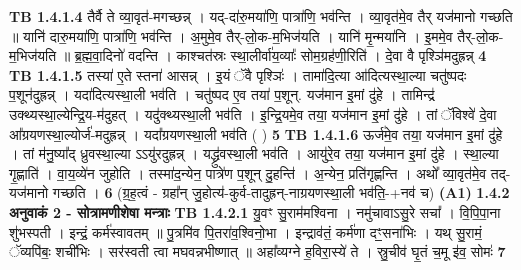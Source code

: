 \documentclass[17pt]{extarticle}
\begin{document}
                  \newline
                                \textbf{ TB 1.4.1.4} \newline
                  तैर्वै ते व्या॒वृत॑-मगच्छन्न् । यद्-दा॑रु॒मया॑णि॒ पात्रा॑णि॒ भव॑न्ति । व्या॒वृत॑मे॒व तैर् यज॑मानो गच्छति ॥ यानि॑ दारु॒मया॑णि॒ पात्रा॑णि॒ भव॑न्ति । अ॒मुमे॒व तैर्-लो॒क-म॒भिज॑यति । यानि॑ मृ॒न्मया॑नि । इ॒ममे॒व तैर्-लो॒क-म॒भिज॑यति ॥ ब्र॒ह्म॒वा॒दिनो॑ वदन्ति । काश्चत॑स्रः स्था॒लीर्वा॑य॒व्याः᳚ सोम॒ग्रह॑णी॒रिति॑ । दे॒वा वै पृश्ञि॑मदुह्रन्न् \textbf{ 4} \newline
                  \newline
                                \textbf{ TB 1.4.1.5} \newline
                  तस्या॑ ए॒ते स्तना॑ आसन्न् । इ॒यं ॅवै पृश्ञिः॑ । तामा॑दि॒त्या आ॑दित्यस्था॒ल्या चतु॑ष्पदः प॒शून॑दुह्रन्न् । यदा॑दित्यस्था॒ली भव॑ति । चतु॑ष्पद ए॒व तया॑ प॒शून्. यज॑मान इ॒मां दु॑हे । तामिन्द्र॑ उक्थ्यस्था॒ल्येन्द्रि॒य-म॑दुहत् । यदु॑क्थ्यस्था॒ली भव॑ति । इ॒न्द्रि॒यमे॒व तया॒ यज॑मान इ॒मां दु॑हे । तां ॅविश्वे॑ दे॒वा आ᳚ग्रयणस्था॒ल्योर्ज॑-मदुह्रन्न् । यदा᳚ग्रयणस्था॒ली भव॑ति ( ) \textbf{ 5} \newline
                  \newline
                                \textbf{ TB 1.4.1.6} \newline
                  ऊर्ज॑मे॒व तया॒ यज॑मान इ॒मां दु॑हे । तां म॑नु॒ष्या᳚द् ध्रुवस्था॒ल्या ऽऽयु॑रदुह्रन्न् । यद्ध्रु॑वस्था॒ली भव॑ति । आयु॑रे॒व तया॒ यज॑मान इ॒मां दु॑हे । स्था॒ल्या गृ॒ह्णाति॑ । वा॒य॒व्ये॑न जुहोति । तस्मा॑द॒न्येन॒ पात्रे॑ण प॒शून् दु॒हन्ति॑ । अ॒न्येन॒ प्रति॑गृह्णन्ति । अथो᳚ व्या॒वृत॑मे॒व तद्-यज॑मानो गच्छति । \textbf{ 6} \newline
                  \newline
                                    (ग्र॒ह॒त्वं - ग्रहा᳚न् जु॒होत्य॑-कुर्व-तादुह्रन्-नाग्रयणस्था॒ली भव॑ति॒-+नव॑ च) \textbf{(A1)} \newline \newline
                \textbf{ 1.4.2      अनुवाकं   2 - सोत्रामणीशेषा मन्त्राः} \newline
                                \textbf{ TB 1.4.2.1} \newline
                  यु॒वꣳ सु॒राम॑मश्विना । नमु॑चावाऽसु॒रे सचा᳚ । वि॒पि॒पा॒ना शु॑भस्पती । इन्द्रं॒ कर्म॑स्वावतम् ॥ पु॒त्रमि॑व पि॒तरा॑व॒श्विनो॒भा । इन्द्राव॑तं॒ कर्म॑णा दꣳ॒॒सना॑भिः । यथ् सु॒रामं॒ ॅव्यपि॑बः॒ शची॑भिः । सर॑स्वती त्वा मघवन्नभीष्णात् ॥ अहा᳚व्यग्ने ह॒विरा॒स्ये॑ ते । स्रु॒चीव॑ घृ॒तं च॒मू इ॑व॒ सोमः॑ \textbf{ 7} \newline
\end{document}
